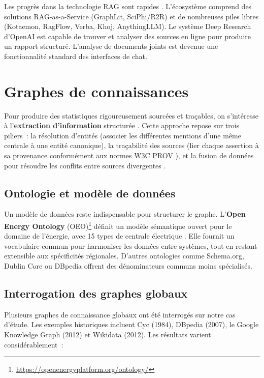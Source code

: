 \documentclass[a4paper,11pt]{report}
\begin{document}
Les progrès dans la technologie RAG sont rapides \citep{UEIVYTV4,SQX6VZRP}. L'écosystème comprend des solutions RAG-as-a-Service (GraphLit, SciPhi/R2R) et de nombreuses piles libres (Kotaemon, RagFlow, Verba, Khoj, AnythingLLM). Le système Deep Research d'OpenAI \citep{Y6A39QJJ} est capable de trouver et analyser des sources en ligne pour produire un rapport structuré. L'analyse de documents joints est devenue une fonctionnalité standard des interfaces de chat.

\chapter{Graphes de connaissances}\label{chap:kg}

Pour produire des statistiques rigoureusement sourcées et traçables, on s'intéresse à l'\textbf{extraction d'information} structurée \citep{MZNGHBPG,D2S7WQT2,P7LFRX4U}. Cette approche repose sur trois piliers~: la résolution d'entités (associer les différentes mentions d'une même centrale à une entité canonique), la traçabilité des sources (lier chaque assertion à sa provenance conformément aux normes W3C PROV \citep{LXQUK658}), et la fusion de données pour résoudre les conflits entre sources divergentes \citep{RI2MXYYS}.

\section{Ontologie et modèle de données}

Un modèle de données reste indispensable pour structurer le graphe. L'\textbf{Open Energy Ontology} (OEO)\footnote{\url{https://openenergyplatform.org/ontology/}} définit un modèle sémantique ouvert pour le domaine de l'énergie, avec 15 types de centrale électrique \citep{G49STI5L}. Elle fournit un vocabulaire commun pour harmoniser les données entre systèmes, tout en restant extensible aux spécificités régionales. D'autres ontologies comme Schema.org, Dublin Core ou DBpedia offrent des dénominateurs communs moins spécialisés.

\section{Interrogation des graphes globaux}

Plusieurs graphes de connaissance globaux ont été interrogés sur notre cas d'étude. Les exemples historiques incluent Cyc (1984), DBpedia (2007), le Google Knowledge Graph (2012) et Wikidata (2012). Les résultats varient considérablement~:
\end{document}
